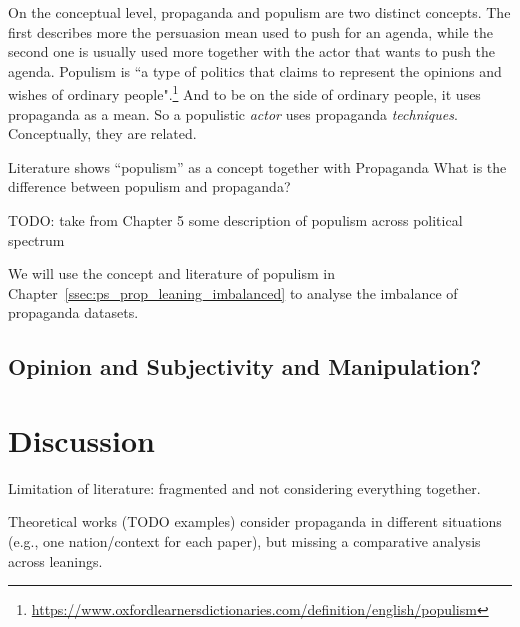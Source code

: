 On the conceptual level, propaganda and populism are two distinct concepts. The first describes more the persuasion mean used to push for an agenda, while the second one is usually used more together with the actor that wants to push the agenda. Populism is ``a type of politics that claims to represent the opinions and wishes of ordinary people".\footnote{\url{https://www.oxfordlearnersdictionaries.com/definition/english/populism}}
And to be on the side of ordinary people, it uses propaganda as a mean. So a populistic \emph{actor} uses propaganda \emph{techniques}. Conceptually, they are related.


Literature shows “populism” as a concept together with Propaganda
What is the difference between populism and propaganda?


TODO: take from Chapter 5 some description of populism across political spectrum

We will use the concept and literature of \gls{populism} in Chapter~\ref{ssec:ps_prop_leaning_imbalanced} to analyse the imbalance of propaganda datasets.


\subsection{Opinion and Subjectivity and Manipulation?}


\section{\statusred Discussion}
\label{sec:lit_discussion}

Limitation of literature: fragmented and not considering everything together.

Theoretical works (TODO examples) consider propaganda in different situations (e.g., one nation/context for each paper), but missing a comparative analysis across leanings.



